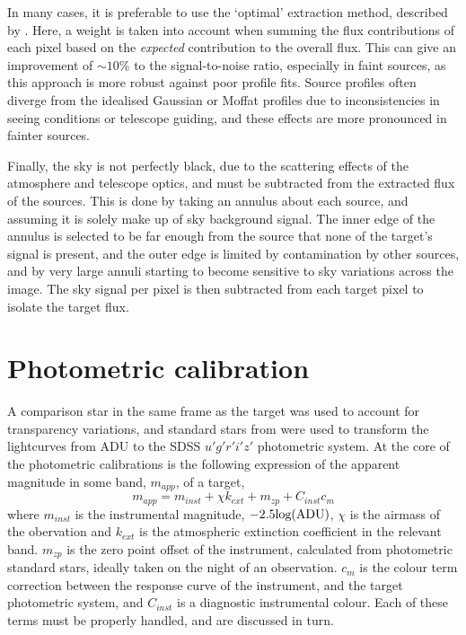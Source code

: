 In many cases, it is preferable to use the `optimal' extraction method, described by \citet{naylor1998}. Here, a weight is taken into account when summing the flux contributions of each pixel based on the {\it expected} contribution to the overall flux. This can give an improvement of $\sim 10\%$ to the signal-to-noise ratio, especially in faint sources, as this approach is more robust against poor profile fits. Source profiles often diverge from the idealised Gaussian or Moffat profiles due to inconsistencies in seeing conditions or telescope guiding, and these effects are more pronounced in fainter sources. 

Finally, the sky is not perfectly black, due to the scattering effects of the atmosphere and telescope optics, and must be subtracted from the extracted flux of the sources. This is done by taking an annulus about each source, and assuming it is solely make up of sky background signal. The inner edge of the annulus is selected to be far enough from the source that none of the target's signal is present, and the outer edge is limited by contamination by other sources, and by very large annuli starting to become sensitive to sky variations across the image. The sky signal per pixel is then subtracted from each target pixel to isolate the target flux.




\section{Photometric calibration}
\label{sect:photometric extraction and calibration}

A comparison star in the same frame as the target was used to account for transparency variations, and standard stars from \citet{smith2002} were used to transform the lightcurves from ADU to the SDSS $u'g'r'i'z'$ photometric system. At the core of the photometric calibrations is the following expression of the apparent magnitude in some band, $m_{app}$, of a target,
\begin{equation}
    \label{eqn:observations:instrumental magnitude from scratch}
    m_{app} = m_{inst} + \chi k_{ext} + m_{zp} + C_{inst}c_{m}
\end{equation}
where $m_{inst}$ is the instrumental magnitude, $-2.5 \rm log(ADU)$, $\chi$ is the airmass of the obervation and $k_{ext}$ is the atmospheric extinction coefficient in the relevant band. $m_{zp}$ is the zero point offset of the instrument, calculated from photometric standard stars, ideally taken on the night of an observation. $c_{m}$ is the colour term correction between the response curve of the instrument, and the target photometric system, and $C_{inst}$ is a diagnostic instrumental colour. Each of these terms must be properly handled, and are discussed in turn. 


